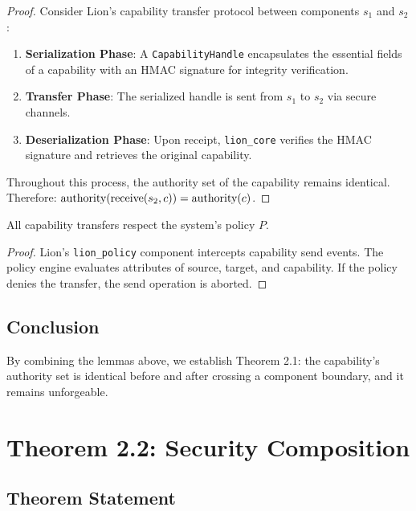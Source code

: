 \begin{proof}
Consider Lion's capability transfer protocol between components $s_1$ and $s_2$:

\begin{enumerate}
\item \textbf{Serialization Phase}: A \texttt{CapabilityHandle} encapsulates the essential fields of a capability with an HMAC signature for integrity verification.

\item \textbf{Transfer Phase}: The serialized handle is sent from $s_1$ to $s_2$ via secure channels.

\item \textbf{Deserialization Phase}: Upon receipt, \texttt{lion\_core} verifies the HMAC signature and retrieves the original capability.
\end{enumerate}

Throughout this process, the authority set of the capability remains identical. Therefore: $\text{authority}(\text{receive}(s_2, c)) = \text{authority}(c)$.
\end{proof}

\begin{lemma}
All capability transfers respect the system's policy $P$.
\end{lemma}

\begin{proof}
Lion's \texttt{lion\_policy} component intercepts capability send events. The policy engine evaluates attributes of source, target, and capability. If the policy denies the transfer, the send operation is aborted.
\end{proof}

\subsection{Conclusion}

By combining the lemmas above, we establish Theorem 2.1: the capability's authority set is identical before and after crossing a component boundary, and it remains unforgeable.

\newpage

\section{Theorem 2.2: Security Composition}

\subsection{Theorem Statement}


